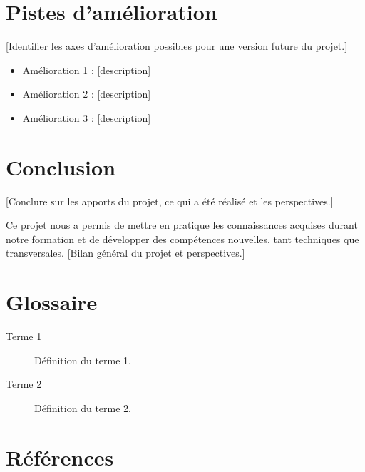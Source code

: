 \documentclass[12pt, a4paper]{article}
\begin{document}
\section{Pistes d'amélioration}

[Identifier les axes d'amélioration possibles pour une version future du projet.]

\begin{itemize}
  \item Amélioration 1 : [description]
  \item Amélioration 2 : [description]
  \item Amélioration 3 : [description]
\end{itemize}

\section{Conclusion}

[Conclure sur les apports du projet, ce qui a été réalisé et les perspectives.]

Ce projet nous a permis de mettre en pratique les connaissances acquises durant
notre formation et de développer des compétences nouvelles, tant techniques que
transversales. [Bilan général du projet et perspectives.]

\section{Glossaire}

\begin{description}
  \item[Terme 1] Définition du terme 1.
  \item[Terme 2] Définition du terme 2.
\end{description}

\section{Références}

\printbibliography[heading=none]
\end{document}
